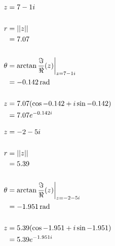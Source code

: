 \documentclass[12pt]{article}
\begin{document}
    
    
    \problemsub
    \begin{align*}
    z &= 7-1i \\
    \\
    r &= ||z|| \\
      &= 7.07 \\
    \\
    \theta &= \arctan\frac{\Im}{\Re}(z) \biggr \rvert_{z = 7-1i} \\
           &= \unit[-0.142]{rad} \\
    \\
    z &= 7.07 (\cos{-0.142} + i\sin{-0.142}) \\
      &= 7.07 e^{-0.142 i}
    \end{align*}


    
    
    
    
    \problemsub
    \begin{align*}
    z &= -2-5i \\
    \\
    r &= ||z|| \\
      &= 5.39 \\
    \\
    \theta &= \arctan\frac{\Im}{\Re}(z) \biggr \rvert_{z = -2-5i} \\
           &= \unit[-1.951]{rad} \\
    \\
    z &= 5.39 (\cos{-1.951} + i\sin{-1.951}) \\
      &= 5.39 e^{-1.951 i}
    \end{align*}





    
    
    \problemsub
    
\end{document}
